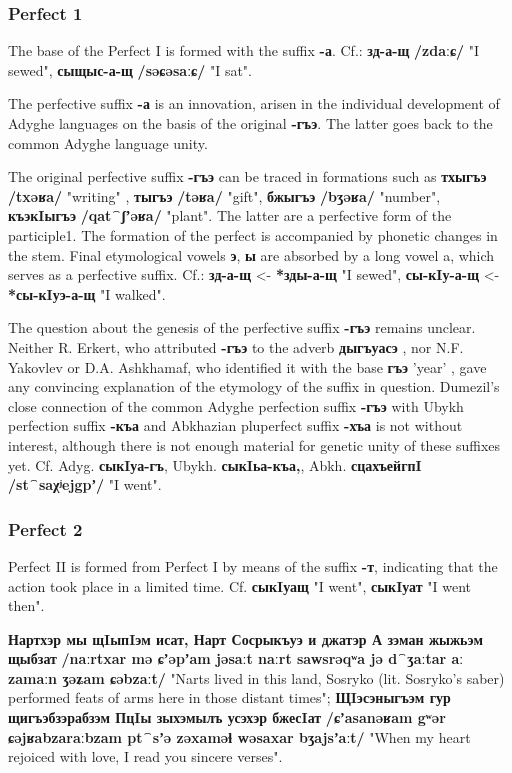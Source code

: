 \documentclass[a4paper,12pt]{book}
\newcommand{\1}[1]{\textbf{\emph{#1}}} %
\newcommand{\2}[1]{\textbf{[#1]}} %
\newcommand{\3}[1]{\fontsize{11pt}{0cm}\textbf{\emph{#1}}} %
\newcommand{\4}[1]{\fontsize{10pt}{0cm}\emph{#1}}	%
\newcommand{\5}[1]{\textbf{/#1/}} %
\newcommand{\6}[1]{\textbf{[#1]}} %
\newcommand{\7}[1]{\fontsize{12pt}{0cm}\emph{#1}} %
\newcommand{\8}[1]{\fontsize{12pt}{0cm}`#1'} %
\newcommand{\9}[1]{\fontsize{12pt}{0cm}(lit. `#1')} %
\newcommand{\glossphonemics}[1]{\textbf{/#1/}} %
\begin{document}
\subsubsection{Perfect 1}
The base of the Perfect I is formed with the suffix \textbf{-а}. Cf.: \textbf{зд-а-щ} \glossphonemics{zdaːɕ} "I sewed", \textbf{сыщыс-а-щ} \glossphonemics{səɕəsaːɕ} "I sat".

The perfective suffix \textbf{-а} is an innovation, arisen in the individual development of Adyghe languages on the basis of the original \textbf{-гъэ}. The latter goes back to the common Adyghe language unity.

The original perfective suffix \textbf{-гъэ} can be traced in formations such as \textbf{тхыгъэ} \glossphonemics{txəʁa} "writing" , \textbf{тыгъэ} \glossphonemics{təʁa} "gift", \textbf{бжыгъэ} \glossphonemics{bʒəʁa} "number", \textbf{къэкIыгъэ} \glossphonemics{qat⁀ʃʼəʁa} "plant". The latter are a perfective form of the participle1. The formation of the perfect is accompanied by phonetic changes in the stem. Final etymological vowels \textbf{э}, \textbf{ы} are absorbed by a long vowel a, which serves as a perfective suffix. Cf.: \textbf{зд-а-щ} <- \textbf{*зды-а-щ} "I sewed", \textbf{сы-кIу-а-щ} <- \textbf{*сы-кIуэ-а-щ} "I walked".

The question about the genesis of the perfective suffix \textbf{-гъэ} remains unclear. Neither R. Erkert, who attributed \textbf{-гъэ} to the adverb \textbf{дыгъуасэ} , nor N.F. Yakovlev or D.A. Ashkhamaf, who identified it with the base \textbf{гъэ} 'year' , gave any convincing explanation of the etymology of the suffix in question. Dumezil's close connection of the common Adyghe perfection suffix \textbf{-гъэ} with Ubykh perfection suffix \textbf{-къа} and Abkhazian pluperfect suffix \textbf{-хъа} is not without interest, although there is not enough material for genetic unity of these suffixes yet. Cf. Adyg. \textbf{сыкIуа-гъ}, Ubykh. \textbf{сыкIьа-къа,}, Abkh. \textbf{сцахъейгпI} \glossphonemics{st⁀saχʲejgpʼ} "I went".
\subsubsection{Perfect 2}
Perfect II is formed from Perfect I by means of the suffix \textbf{-т}, indicating that the action took place in a limited time. Cf. \textbf{сыкIуащ} "I went", \textbf{сыкIуат} "I went then".

\textbf{Нартхэр мы щIыпIэм исат, Нарт Сосрыкъуэ и джатэр А зэман жыжьэм щыбзат} \glossphonemics{naːrtxar mə ɕʼəpʼam jəsaːt naːrt sawsrəqʷa jə d⁀ʒaːtar aː zamaːn ʒəʑam ɕəbzaːt} "Narts lived in this land, Sosryko (lit. Sosryko's saber) performed feats of arms here in those distant times"; \textbf{ЩIэсэныгъэм гур щигъэбзэрабзэм ПцIы зыхэмылъ усэхэр бжесIат} \glossphonemics{ɕʼasanəʁam gʷər ɕəjʁabzaraːbzam pt⁀sʼə zəxaməɬ wəsaxar bʒajsʼaːt} "When my heart rejoiced with love, I read you sincere verses".
\end{document}
